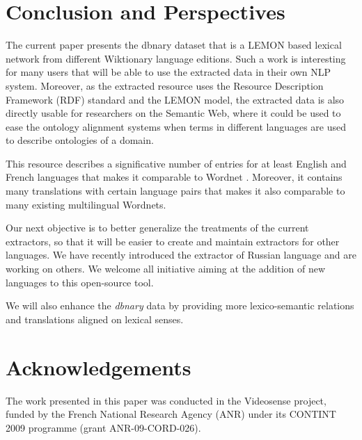 \documentclass[sw]{iosart2c}
\begin{document}
\section{Conclusion and Perspectives}

The current paper presents the dbnary dataset that is a LEMON based lexical network from different Wiktionary language editions. Such a work is interesting for many users that will be able to use the extracted data in their own NLP system. Moreover, as the extracted resource uses the Resource Description Framework (RDF) standard and the LEMON model, the extracted data is also directly usable for researchers on the Semantic Web, where it could be used to ease the ontology alignment systems when terms in different languages are used to describe ontologies of a domain.

This resource describes a significative number of entries for at least English and French languages that makes it comparable to Wordnet \cite{wordnet-fellbaum}. Moreover, it contains many translations with certain language pairs that makes it also comparable to many existing multilingual Wordnets.

Our next objective is to better generalize the treatments of the current extractors, so that it will be easier to create and maintain extractors for other languages. We have recently introduced the extractor of Russian language and are working on others. We welcome all initiative aiming at the addition of new languages to this open-source tool. 

We will also enhance the \textit{dbnary} data by providing more lexico-semantic relations and translations aligned on lexical senses.

\section{Acknowledgements}

The work presented in this paper was conducted in the Videosense project, funded by the French National Research Agency (ANR) under its CONTINT 2009 programme (grant ANR-09-CORD-026).
\end{document}
